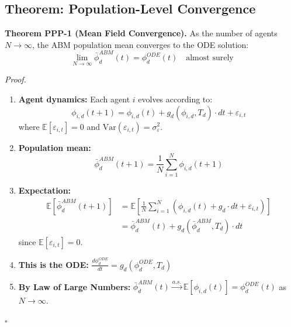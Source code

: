 \subsection{Theorem: Population-Level Convergence}

\begin{tcolorbox}[colback=green!5!white, colframe=green!75!black, title=Theorem PPP-1: Mean Field Convergence]
\textbf{Theorem PPP-1 (Mean Field Convergence).}
As the number of agents $N \to \infty$, the ABM population mean converges to the ODE solution:
\begin{equation}
\lim_{N \to \infty} \bar{\phi}^{ABM}_d(t) = \phi^{ODE}_d(t) \quad \text{almost surely}
\label{eq:ppp-mean-field}
\end{equation}

\textit{Proof.}
\begin{enumerate}
\item \textbf{Agent dynamics:} Each agent $i$ evolves according to:
\begin{equation}
\phi_{i,d}(t+1) = \phi_{i,d}(t) + g_d(\phi_{i,d}, T_d) \cdot dt + \varepsilon_{i,t}
\end{equation}
where $\mathbb{E}[\varepsilon_{i,t}] = 0$ and $\text{Var}(\varepsilon_{i,t}) = \sigma^2_\varepsilon$.

\item \textbf{Population mean:}
\begin{equation}
\bar{\phi}^{ABM}_d(t+1) = \frac{1}{N} \sum_{i=1}^{N} \phi_{i,d}(t+1)
\end{equation}

\item \textbf{Expectation:}
\begin{align}
\mathbb{E}[\bar{\phi}^{ABM}_d(t+1)] &= \mathbb{E}\left[\frac{1}{N} \sum_{i=1}^{N} \left(\phi_{i,d}(t) + g_d \cdot dt + \varepsilon_{i,t}\right)\right] \\
&= \bar{\phi}^{ABM}_d(t) + g_d(\bar{\phi}^{ABM}_d, T_d) \cdot dt
\end{align}
since $\mathbb{E}[\varepsilon_{i,t}] = 0$.

\item \textbf{This is the ODE:} $\frac{d\phi^{ODE}_d}{dt} = g_d(\phi^{ODE}_d, T_d)$

\item \textbf{By Law of Large Numbers:} $\bar{\phi}^{ABM}_d(t) \xrightarrow{a.s.} \mathbb{E}[\phi_{i,d}(t)] = \phi^{ODE}_d(t)$ as $N \to \infty$.
\end{enumerate}
\hfill $\square$
\end{tcolorbox}

